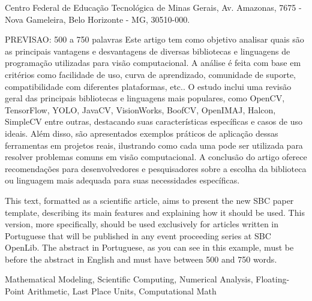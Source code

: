 \documentclass[portuguese]{sbc2025}%
\begin{document}

\begin{frontmatter}

\maketitle

\begin{mail}
Centro Federal de Educação Tecnológica de Minas Gerais,  Av. Amazonas, 7675 - Nova Gameleira, Belo Horizonte - MG, 30510-000. 
\end{mail}

\begin{abstract-pt}
  PREVISAO: 500 a 750 palavras
  Este artigo tem como objetivo analisar quais são as principais vantagens e desvantagens de diversas bibliotecas e linguagens de programação utilizadas para visão computacional. A análise é feita com base em critérios como facilidade de uso, curva de aprendizado, comunidade de suporte, compatibilidade com diferentes plataformas, etc.. O estudo inclui uma revisão geral das principais bibliotecas e linguagens mais populares, como OpenCV, TensorFlow, YOLO, JavaCV, VisionWorks, BoofCV, OpenIMAJ, Halcon, SimpleCV entre outras, destacando suas características específicas e casos de uso ideais. Além disso, são apresentados exemplos práticos de aplicação dessas ferramentas em projetos reais, ilustrando como cada uma pode ser utilizada para resolver problemas comuns em visão computacional. A conclusão do artigo oferece recomendações para desenvolvedores e pesquisadores sobre a escolha da biblioteca ou linguagem mais adequada para suas necessidades específicas.
\end{abstract-pt}

\begin{abstract-en}
This text, formatted as a scientific article, aims to present the new SBC paper template, describing its main features and explaining how it should be used. This version, more specifically, should be used exclusively for articles written in Portuguese that will be published in any event proceeding series at SBC OpenLib. The abstract in Portuguese, as you can see in this example, must be before the abstract in English and must have between 500 and 750 words.
\end{abstract-en}

\begin{pchaves}
Mathematical Modeling, Scientific Computing, Numerical Analysis, Floating-Point Arithmetic, Last Place Units, Computational Math
\end{pchaves}


\end{frontmatter}
\end{document}
